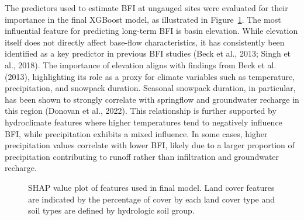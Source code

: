 \documentclass[
]{agujournal2019}
\begin{document}
The predictors used to estimate BFI at ungauged sites were evaluated for
their importance in the final XGBoost model, as illustrated in
Figure~\ref{fig-shap_values}. The most influential feature for
predicting long-term BFI is basin elevation. While elevation itself does
not directly affect base-flow characteristics, it has consistently been
identified as a key predictor in previous BFI studies (Beck et al.,
2013; Singh et al., 2018). The importance of elevation aligns with
findings from Beck et al. (2013), highlighting its role as a proxy for
climate variables such as temperature, precipitation, and snowpack
duration. Seasonal snowpack duration, in particular, has been shown to
strongly correlate with springflow and groundwater recharge in this
region (Donovan et al., 2022). This relationship is further supported by
hydroclimate features where higher temperatures tend to negatively
influence BFI, while precipitation exhibits a mixed influence. In some
cases, higher precipitation values correlate with lower BFI, likely due
to a larger proportion of precipitation contributing to runoff rather
than infiltration and groundwater recharge.

\begin{figure}


\caption{\label{fig-shap_values}SHAP value plot of features used in
final model. Land cover features are indicated by the percentage of
cover by each land cover type and soil types are defined by hydrologic
soil group.}

\end{figure}%
\end{document}
